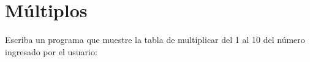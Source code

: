 \section{Múltiplos}

Escriba un programa que muestre la tabla de multiplicar del 1 al 10 del
número ingresado por el usuario:
